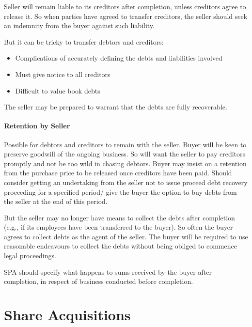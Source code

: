 \documentclass[
]{article}
\providecommand{\tightlist}{%
  \setlength{\itemsep}{0pt}\setlength{\parskip}{0pt}}
\begin{document}
Seller will remain liable to its creditors after completion, unless
creditors agree to release it. So when parties have agreed to transfer
creditors, the seller should seek an indemnity from the buyer against
such liability.

But it can be tricky to transfer debtors and creditors:

\begin{itemize}
\tightlist
\item
  Complications of accurately defining the debts and liabilities
  involved
\item
  Must give notice to all creditors
\item
  Difficult to value book debts
\end{itemize}

The seller may be prepared to warrant that the debts are fully
recoverable.

\hypertarget{retention-by-seller}{%
\paragraph{Retention by Seller}\label{retention-by-seller}}

Possible for debtors and creditors to remain with the seller. Buyer will
be keen to preserve goodwill of the ongoing business. So will want the
seller to pay creditors promptly and not be too wild in chasing debtors.
Buyer may insist on a retention from the purchase price to be released
once creditors have been paid. Should consider getting an undertaking
from the seller not to issue proceed debt recovery proceeding for a
specified period/ give the buyer the option to buy debts from the seller
at the end of this period.

But the seller may no longer have means to collect the debts after
completion (e.g., if its employees have been transferred to the buyer).
So often the buyer agrees to collect debts as the agent of the seller.
The buyer will be required to use reasonable endeavours to collect the
debts without being obliged to commence legal proceedings.

SPA should specify what happens to sums received by the buyer after
completion, in respect of business conducted before completion.

\hypertarget{share-acquisitions}{%
\section{Share Acquisitions}\label{share-acquisitions}}
\end{document}
